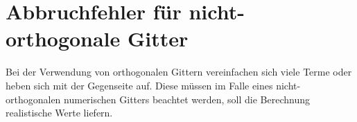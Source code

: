 






\section{Abbruchfehler für nicht-orthogonale Gitter}

Bei der Verwendung von orthogonalen Gittern vereinfachen sich viele Terme oder
heben sich mit der Gegenseite auf. Diese müssen im Falle eines nicht-orthogonalen
numerischen Gitters beachtet werden, soll die Berechnung realistische Werte liefern.

